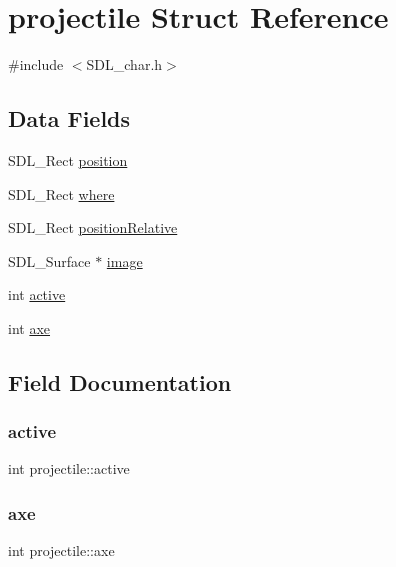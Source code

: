\hypertarget{structprojectile}{}\section{projectile Struct Reference}
\label{structprojectile}


{\ttfamily \#include $<$S\+D\+L\+\_\+char.\+h$>$}

\subsection*{Data Fields}
\begin{DoxyCompactItemize}
\item 
S\+D\+L\+\_\+\+Rect \mbox{\hyperlink{structprojectile_a653b488cdc318abd4b0cbaf13469558b}{position}}
\item 
S\+D\+L\+\_\+\+Rect \mbox{\hyperlink{structprojectile_a9577556e4bb2b7a479f0b8a9ffa03018}{where}}
\item 
S\+D\+L\+\_\+\+Rect \mbox{\hyperlink{structprojectile_a0fe40930b1a904908401fbc94e49c962}{position\+Relative}}
\item 
S\+D\+L\+\_\+\+Surface $\ast$ \mbox{\hyperlink{structprojectile_a17c742a3bac8e4a04c318f193bcaa423}{image}}
\item 
int \mbox{\hyperlink{structprojectile_aa84ac35cbc967bee2b13a4d31ff11360}{active}}
\item 
int \mbox{\hyperlink{structprojectile_a427a45ba9ac140f6fde71d3afffe4233}{axe}}
\end{DoxyCompactItemize}


\subsection{Field Documentation}
\mbox{\label{structprojectile_aa84ac35cbc967bee2b13a4d31ff11360}} 
\subsubsection{\texorpdfstring{active}{active}}
{\footnotesize\ttfamily int projectile\+::active}

\mbox{\label{structprojectile_a427a45ba9ac140f6fde71d3afffe4233}} 
\subsubsection{\texorpdfstring{axe}{axe}}
{\footnotesize\ttfamily int projectile\+::axe}

